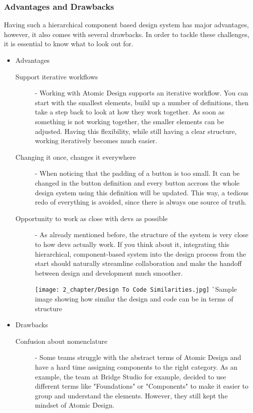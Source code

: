 \subsubsection{Advantages and Drawbacks}
Having such a hierarchical component based design system has major advantages, however, it also
comes with several drawbacks. In order to tackle these challenges, it is essential to know what to
look out for.

\begin{itemize}
	\item Advantages
	      \begin{description}
		      \item[Support iterative workflows] - Working with Atomic Design supports an iterative
		            workflow. You can start with the smallest elements, build up a number of
		            definitions, then take a step back to look at how they work together. As soon as
		            something is not working together, the smaller elements can be adjusted. Having
		            this flexibility, while still having a clear structure, working iteratively
		            becomes much easier.  
		      \item[Changing it once, changes it everywhere] - When noticing that the padding
		            of a button is too small. It can be changed in the button definition and every
		            button accross the whole design system using this definition will be updated.
		            This way, a tedious redo of everything is avoided, since there is always one
		            source of truth.
		      \item[Opportunity to work as close with devs as possible] - As already mentioned
		            before, the structure of the system is very close to how devs actually work.
		            If you think about it, integrating this hierarchical, component-based system
		            into the design process from the start should naturally streamline collaboration
		            and make the handoff between design and development much smoother.

		            \texttt{[image: 2\_chapter/Design To Code Similarities.jpg]}
		            ^^ Sample image showing how similar the design and code can be in terms of structure
	      \end{description}
	\item Drawbacks
	      \begin{description}
		      \item[Confusion about nomenclature] - Some teams struggle with the abstract terms of
		            Atomic Design and have a hard time assigning components to the right category.
		            As an example, the team at Bridge Studio for example, decided to use different
		            terms like "Foundations" or "Components" to make it easier to group and
		            understand the elements. However, they still kept the mindset of Atomic Design.


\end{description}
\end{itemize}
